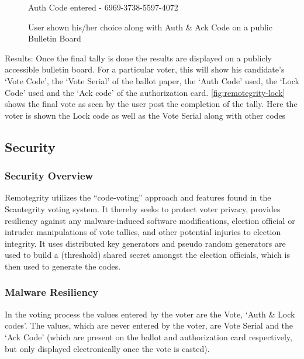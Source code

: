 \begin{figure}
  \centering {}
  \caption{Auth Code entered - 6969-3738-5597-4072}
  \label{fig:remotegrity-auth-code}
\end{figure}

\begin{figure}
  \centering {}
  \caption{User shown his/her choice along with Auth \& Ack Code on a
    public Bulletin Board}
  \label{fig:remotegrity-bb}
\end{figure}

Results: Once the final tally is done the results are displayed on a
publicly accessible bulletin board. For a particular voter, this will
show his candidate's `Vote Code', the `Vote Serial' of the ballot
paper, the `Auth Code' used, the `Lock Code' used and the `Ack code'
of the authorization card. \autoref{fig:remotegrity-lock} shows the
final vote as seen by the user post the completion of the tally. Here
the voter is shown the Lock code as well as the Vote Serial along with
other codes

\subsection{Security}

\subsubsection{Security Overview}

Remotegrity utilizes the ``code-voting'' approach and features found
in the Scantegrity voting system. It thereby seeks to protect voter
privacy, provides resiliency against any malware-induced software
modifications, election official or intruder manipulations of vote
tallies, and other potential injuries to election integrity. It uses
distributed key generators and pseudo random generators are used to
build a (threshold) shared secret amongst the election officials,
which is then used to generate the codes.

\subsubsection{Malware Resiliency}

In the voting process the values entered by the voter are the Vote,
`Auth \& Lock codes'. The values, which are never entered by the
voter, are Vote Serial and the `Ack Code' (which are present on the
ballot and authorization card respectively, but only displayed
electronically once the vote is casted).

